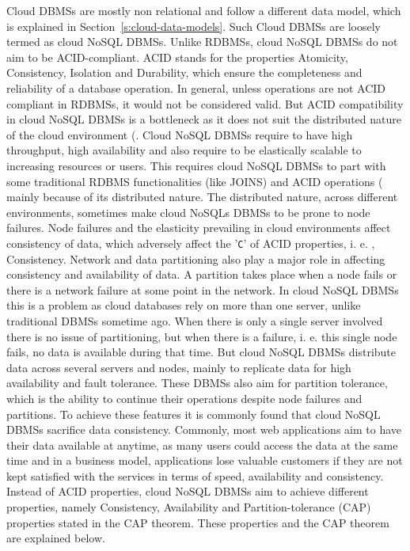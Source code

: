 Cloud \acp{DBMS} are mostly non relational and follow a different data model,
which is explained in Section~\ref{s:cloud-data-models}.  Such Cloud \acp{DBMS}
are loosely termed as cloud \ac{NoSQL} \acp{DBMS}.  Unlike \acp{RDBMS},   cloud
\ac{NoSQL} \acp{DBMS} do not aim to be ACID-compliant.
ACID stands for the properties Atomicity,   Consistency,   Isolation and
Durability, which ensure the completeness and reliability of a database
operation.  In general,   unless operations are not ACID compliant in
\acp{RDBMS},   it would not be considered valid.
But ACID compatibility in cloud \ac{NoSQL} \acp{DBMS} is a bottleneck as it does
not suit the distributed nature of the cloud environment (.
Cloud \ac{NoSQL} \acp{DBMS} require to have high throughput,   high availability
and also require to be elastically scalable to increasing resources or users.
This requires cloud \ac{NoSQL} \acp{DBMS} to part with some traditional
\ac{RDBMS} functionalities (like JOINS) and ACID operations ( mainly because of its distributed nature.  The distributed nature, across
different environments,   sometimes make cloud \acp{NoSQL} \acp{DBMS} to be
prone to node failures.  Node failures and the elasticity prevailing in cloud
environments affect consistency of data,   which adversely affect the
'\texttt{C}' of ACID properties,   i. e. ,   Consistency.  Network and data
partitioning also play a major role in affecting consistency and availability of
data.   A partition takes place when a node fails or there is a network failure
at some point in the network.  In cloud \ac{NoSQL} \acp{DBMS} this is a problem
as cloud databases rely on more than one server,   unlike traditional \acp{DBMS}
sometime ago.  When there is only a single server involved there is no issue of
partitioning,   but when there is a failure,   i. e.  this single node fails,  
no data is available during that time.  But cloud \ac{NoSQL} \acp{DBMS}
distribute data across several servers and nodes,   mainly to replicate data for
high availability and fault tolerance.
These \acp{DBMS} also aim for partition tolerance,   which is the ability to
continue their operations despite node failures and partitions.  To achieve
these features it is commonly found that cloud \ac{NoSQL} \acp{DBMS} sacrifice
data consistency.  Commonly,   most web applications aim to have their data
available at anytime,   as many users could access the data at the same time and
in a business model,   applications lose valuable customers if they are not kept
satisfied with the services in terms of speed,   availability and consistency. 
Instead of ACID properties,   cloud \ac{NoSQL} \acp{DBMS} aim to achieve
different properties,   namely Consistency,   Availability and
Partition-tolerance (CAP) properties stated in the CAP theorem.
These properties and the CAP theorem are explained below.

